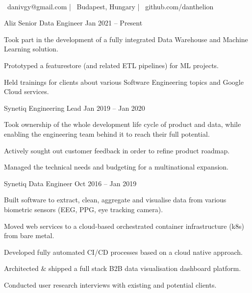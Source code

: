 \documentclass[]{awesome-cv}
\begin{document}
    
\begin{center}
	  \\
	\vspace{2mm}
	{\faEnvelope\ danivgy@gmail.com} | {\faMapMarker\ Budapest, Hungary} | {\faLink\ github.com/danthelion}
\end{center}
\begin{cventries}
	\cventry
	{Aliz}
	{Senior Data Engineer}
	{Jan 2021 – Present}
	{}
	{\begin{cvitems}
		\item {Took part in the development of a fully integrated Data Warehouse and Machine Learning solution.}
		\item {Prototyped a featurestore (and related ETL pipelines) for ML projects.}
		\item {Held trainings for clients about various Software Engineering topics and Google Cloud services.}
		\end{cvitems}}
	\cventry
	{Synetiq}
	{Engineering Lead}
	{Jan 2019 – Jan 2020}
	{}
	{\begin{cvitems}
		\item {Took ownership of the whole development life cycle of product and data, while enabling the engineering team behind it to reach their full potential.}
		\item {Actively sought out customer feedback in order to refine product roadmap.}
		\item {Managed the technical needs and budgeting for a multinational expansion.}
		\end{cvitems}}
	\cventry
	{Synetiq}
	{Data Engineer}
	{Oct 2016 – Jan 2019}
	{}
	{\begin{cvitems}
		\item {Built software to extract, clean, aggregate and visualise data from various biometric sensors (EEG, PPG, eye tracking camera).}
		\item {Moved web services to a cloud-based orchestrated container infrastructure (k8s) from bare metal.}
		\item {Developed fully automated CI/CD processes based on a cloud native approach.}
		\item {Architected \& shipped a full stack B2B data visualisation dashboard platform.}
		\item {Conducted user research interviews with existing and potential clients.}

\end{cvitems}}
\end{cventries}
\end{document}
